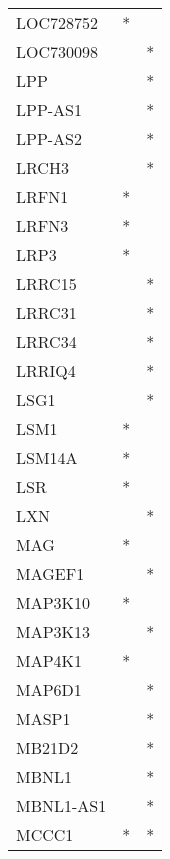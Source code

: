 \begin{longtable}{lcc}
LOC728752        &              * &            \\
LOC730098        &                &          * \\
LPP              &                &          * \\
LPP-AS1          &                &          * \\
LPP-AS2          &                &          * \\
LRCH3            &                &          * \\
LRFN1            &              * &            \\
LRFN3            &              * &            \\
LRP3             &              * &            \\
LRRC15           &                &          * \\
LRRC31           &                &          * \\
LRRC34           &                &          * \\
LRRIQ4           &                &          * \\
LSG1             &                &          * \\
LSM1             &              * &            \\
LSM14A           &              * &            \\
LSR              &              * &            \\
LXN              &                &          * \\
MAG              &              * &            \\
MAGEF1           &                &          * \\
MAP3K10          &              * &            \\
MAP3K13          &                &          * \\
MAP4K1           &              * &            \\
MAP6D1           &                &          * \\
MASP1            &                &          * \\
MB21D2           &                &          * \\
MBNL1            &                &          * \\
MBNL1-AS1        &                &          * \\
MCCC1            &              * &          * \\

\end{longtable}
